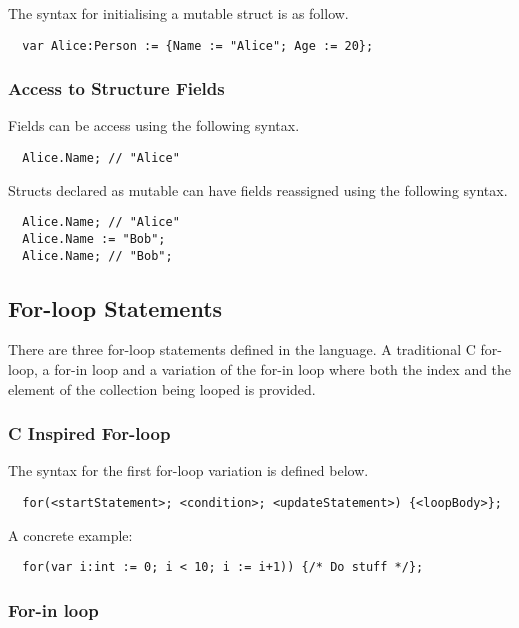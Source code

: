 The syntax for initialising a mutable struct is as follow.

\begin{verbatim}
  var Alice:Person := {Name := "Alice"; Age := 20};
\end{verbatim}

\subsubsection{Access to Structure Fields}
\label{sec:accessStructFields}

Fields can be access using the following syntax.

\begin{verbatim}
  Alice.Name; // "Alice"
\end{verbatim}

Structs declared as mutable can have fields reassigned using the following syntax.

\begin{verbatim}
  Alice.Name; // "Alice"
  Alice.Name := "Bob";
  Alice.Name; // "Bob";
\end{verbatim}

\subsection{For-loop Statements}
\label{sec:forLoopStatements}

There are three for-loop statements defined in the language. A traditional C for-loop, a for-in loop and a variation of the for-in loop where both the index and the element of the collection being looped is provided.

\subsubsection{C Inspired For-loop}
\label{sec:cForLoop}

The syntax for the first for-loop variation is defined below.

\begin{verbatim}
  for(<startStatement>; <condition>; <updateStatement>) {<loopBody>};
\end{verbatim}

A concrete example:

\begin{verbatim}
  for(var i:int := 0; i < 10; i := i+1)) {/* Do stuff */};
\end{verbatim}

\subsubsection{For-in loop}
\label{sec:forInLoop}

